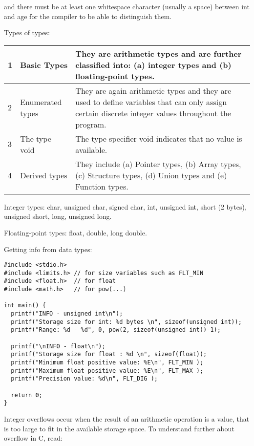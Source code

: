 \documentclass[11pt]{article}
\begin{document}
and there must be at least one whitespace character (usually a space) between int and age for the compiler to be able to distinguish them.

Types of types:


\begin{center}
  \begin{tabular}{ | l | m{3cm} | m{6cm} | }
    \hline
    1 & Basic Types & They are arithmetic types and are further classified into: (a) integer types and (b) floating-point types. \\ \hline
    2 & Enumerated types & They are again arithmetic types and they are used to define variables that can only assign certain discrete integer values throughout the program. \\ \hline
    3 & The type void & The type specifier void indicates that no value is available. \\ \hline
    4 & Derived types & They include (a) Pointer types, (b) Array types, (c) Structure types, (d) Union types and (e) Function types. \\
    \hline
  \end{tabular}
\end{center}

Integer types: char, unsigned char, signed char, int, unsigned int, short (2 bytes), unsigned short, long, unsigned long.

Floating-point types: float, double, long double.

Getting info from data types:

\begin{lstlisting}
#include <stdio.h>
#include <limits.h> // for size variables such as FLT_MIN
#include <float.h>  // for float
#include <math.h>   // for pow(...)

int main() {
  printf("INFO - unsigned int\n");
  printf("Storage size for int: %d bytes \n", sizeof(unsigned int));
  printf("Range: %d - %d", 0, pow(2, sizeof(unsigned int))-1);

  printf("\nINFO - float\n");
  printf("Storage size for float : %d \n", sizeof(float));
  printf("Minimum float positive value: %E\n", FLT_MIN );
  printf("Maximum float positive value: %E\n", FLT_MAX );
  printf("Precision value: %d\n", FLT_DIG );

  return 0;
}
\end{lstlisting}


Integer overflows occur when the result of an arithmetic operation is a value, that is too large to fit in the available storage space. To understand further about overflow in C, read:
\end{document}
